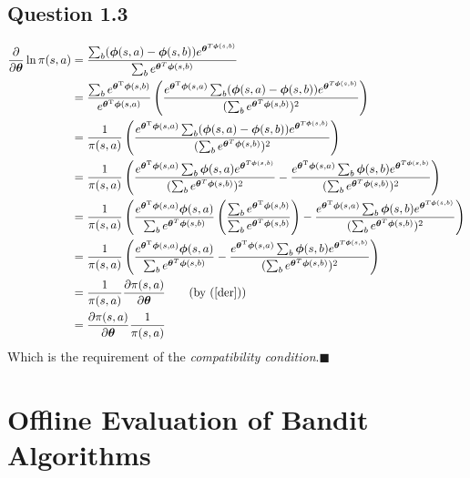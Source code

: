 \documentclass[a4paper]{article}
\newcommand*{\QEDA}{\hfill\ensuremath{\blacksquare}}%
\newcommand*{\bs}[1]{\boldsymbol{#1}}
\begin{document}
\subsection*{Question 1.3}
\label{subsec:11}
\begin{align*}
  \frac{\partial}{\partial \boldsymbol{\theta}} \ln \pi(s, a) &=
  \frac{\sum_{b}(\bs{\phi}(s,a) - \bs{\phi}(s,b)) e^{\bs{\theta}^{T\bs{\phi}(s,b)}} }
       {\sum_{b}e^{\bs{\theta}^T\bs{\phi}(s,b)}}\\
 &=
  \frac{\sum_{b} e^{\boldsymbol{\theta}^{\mathrm{T}} \boldsymbol{\phi}(s, b)}}
       {e^{\boldsymbol{\theta}^{\mathrm{T}} \boldsymbol{\phi}(s, a)}}
  \left( \frac{e^{\boldsymbol{\theta}^{\mathrm{T}} \boldsymbol{\phi}(s, a)}
   \sum_{b}(\bs{\phi}(s,a) - \bs{\phi}(s,b)) e^{\bs{\theta}^{T\bs{\phi}(s,b)}} }
   {(\sum_{b}e^{\bs{\theta}^T\bs{\phi}(s,b)})^2}\right)\\
 &=
  \frac{1}{\pi(s,a)}
  \left(
  \frac{e^{\boldsymbol{\theta}^{\mathrm{T}} \boldsymbol{\phi}(s, a)}
    \sum_{b}(\bs{\phi}(s,a) - \bs{\phi}(s,b)) e^{\bs{\theta}^{T\bs{\phi}(s,b)}} }
       {(\sum_{b}e^{\bs{\theta}^T\bs{\phi}(s,b)})^2}
  \right)\\
 &=
  \frac{1}{\pi(s,a)}
  \left(
  \frac{e^{\boldsymbol{\theta}^{\mathrm{T}} \boldsymbol{\phi}(s, a)}
    \sum_{b}\bs{\phi}(s,a) e^{\bs{\theta}^{T\bs{\phi}(s,b)}} }
       {(\sum_{b}e^{\bs{\theta}^T\bs{\phi}(s,b)})^2}
  -
  \frac{e^{\boldsymbol{\theta}^{\mathrm{T}} \boldsymbol{\phi}(s, a)}
    \sum_{b}\bs{\phi}(s,b) e^{\bs{\theta}^{T\bs{\phi}(s,b)}} }
       {(\sum_{b}e^{\bs{\theta}^T\bs{\phi}(s,b)})^2}
  \right)\\
 &=
  \frac{1}{\pi(s,a)}
  \left(
  \frac{e^{\boldsymbol{\theta}^{\mathrm{T}} \boldsymbol{\phi}(s, a)}\bs{\phi}(s,a)}
       {\sum_{b}e^{\bs{\theta}^T\bs{\phi}(s,b)}}
  \left(
  \frac{\sum_be^{\boldsymbol{\theta}^{\mathrm{T}} \boldsymbol{\phi}(s, b)}}
       {\sum_{b}e^{\bs{\theta}^T\bs{\phi}(s,b)}}
  \right)
  -
  \frac{e^{\boldsymbol{\theta}^{\mathrm{T}} \boldsymbol{\phi}(s, a)}
    \sum_{b}\bs{\phi}(s,b) e^{\bs{\theta}^{T\bs{\phi}(s,b)}} }
       {(\sum_{b}e^{\bs{\theta}^T\bs{\phi}(s,b)})^2}
  \right)\\
 &=
  \frac{1}{\pi(s,a)}
  \left(
  \frac{e^{\boldsymbol{\theta}^{\mathrm{T}} \boldsymbol{\phi}(s, a)}\bs{\phi}(s,a)}
       {\sum_{b}e^{\bs{\theta}^T\bs{\phi}(s,b)}}
  -
  \frac{e^{\boldsymbol{\theta}^{\mathrm{T}} \boldsymbol{\phi}(s, a)}
    \sum_{b}\bs{\phi}(s,b) e^{\bs{\theta}^{T\bs{\phi}(s,b)}} }
       {(\sum_{b}e^{\bs{\theta}^T\bs{\phi}(s,b)})^2}
  \right)\\
&=
  \frac{1}{\pi(s,a)}
  \frac{\partial \pi(s, a)}{\partial \boldsymbol{\theta}} \tag{by (\ref{der})}\\
&=
  \frac{\partial \pi(s, a)}{\partial \boldsymbol{\theta}} 
  \frac{1}{\pi(s,a)}
\end{align*}
Which is the requirement of the \emph{compatibility condition}.\QEDA

\section{Offline Evaluation of Bandit Algorithms}
\label{sec:2}
\end{document}
